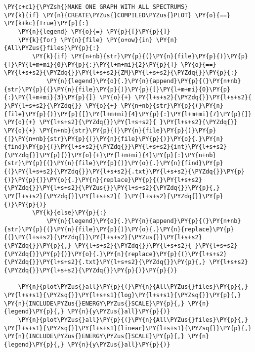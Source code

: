 \begin{tcolorbox}[breakable, size=fbox, boxrule=1pt, pad at break*=1mm,colback=cellbackground, colframe=cellborder]
\begin{Verbatim}[commandchars=\\\{\}]
\PY{c+c1}{\PYZsh{}MAKE ONE GRAPH WITH ALL SPECTRUMS}
\PY{k}{if} \PY{n}{CREATE\PYZus{}COMPILED\PYZus{}PLOT} \PY{o}{==} \PY{k+kc}{True}\PY{p}{:}
    \PY{n}{legend} \PY{o}{=} \PY{p}{[}\PY{p}{]}
    \PY{k}{for} \PY{n}{file} \PY{o+ow}{in} \PY{n}{All\PYZus{}files}\PY{p}{:}
        \PY{k}{if} \PY{n+nb}{str}\PY{p}{(}\PY{n}{file}\PY{p}{)}\PY{p}{[}\PY{l+m+mi}{0}\PY{p}{:}\PY{l+m+mi}{2}\PY{p}{]} \PY{o}{==} \PY{l+s+s2}{\PYZdq{}}\PY{l+s+s2}{ZM}\PY{l+s+s2}{\PYZdq{}}\PY{p}{:}
            \PY{n}{legend}\PY{o}{.}\PY{n}{append}\PY{p}{(}\PY{n+nb}{str}\PY{p}{(}\PY{n}{file}\PY{p}{)}\PY{p}{[}\PY{l+m+mi}{0}\PY{p}{:}\PY{l+m+mi}{3}\PY{p}{]} \PY{o}{+} \PY{l+s+s2}{\PYZdq{}}\PY{l+s+s2}{ }\PY{l+s+s2}{\PYZdq{}} \PY{o}{+} \PY{n+nb}{str}\PY{p}{(}\PY{n}{file}\PY{p}{)}\PY{p}{[}\PY{l+m+mi}{4}\PY{p}{:}\PY{l+m+mi}{7}\PY{p}{]} \PY{o}{+} \PY{l+s+s2}{\PYZdq{}}\PY{l+s+s2}{ }\PY{l+s+s2}{\PYZdq{}} \PY{o}{+} \PY{n+nb}{str}\PY{p}{(}\PY{n}{file}\PY{p}{)}\PY{p}{[}\PY{n+nb}{str}\PY{p}{(}\PY{n}{file}\PY{p}{)}\PY{o}{.}\PY{n}{find}\PY{p}{(}\PY{l+s+s2}{\PYZdq{}}\PY{l+s+s2}{int}\PY{l+s+s2}{\PYZdq{}}\PY{p}{)}\PY{o}{+}\PY{l+m+mi}{4}\PY{p}{:}\PY{n+nb}{str}\PY{p}{(}\PY{n}{file}\PY{p}{)}\PY{o}{.}\PY{n}{find}\PY{p}{(}\PY{l+s+s2}{\PYZdq{}}\PY{l+s+s2}{.txt}\PY{l+s+s2}{\PYZdq{}}\PY{p}{)}\PY{p}{]}\PY{o}{.}\PY{n}{replace}\PY{p}{(}\PY{l+s+s2}{\PYZdq{}}\PY{l+s+s2}{\PYZus{}}\PY{l+s+s2}{\PYZdq{}}\PY{p}{,} \PY{l+s+s2}{\PYZdq{}}\PY{l+s+s2}{ }\PY{l+s+s2}{\PYZdq{}}\PY{p}{)}\PY{p}{)}
        \PY{k}{else}\PY{p}{:}
            \PY{n}{legend}\PY{o}{.}\PY{n}{append}\PY{p}{(}\PY{n+nb}{str}\PY{p}{(}\PY{n}{file}\PY{p}{)}\PY{o}{.}\PY{n}{replace}\PY{p}{(}\PY{l+s+s2}{\PYZdq{}}\PY{l+s+s2}{\PYZus{}}\PY{l+s+s2}{\PYZdq{}}\PY{p}{,} \PY{l+s+s2}{\PYZdq{}}\PY{l+s+s2}{ }\PY{l+s+s2}{\PYZdq{}}\PY{p}{)}\PY{o}{.}\PY{n}{replace}\PY{p}{(}\PY{l+s+s2}{\PYZdq{}}\PY{l+s+s2}{.txt}\PY{l+s+s2}{\PYZdq{}}\PY{p}{,} \PY{l+s+s2}{\PYZdq{}}\PY{l+s+s2}{\PYZdq{}}\PY{p}{)}\PY{p}{)}
    
    \PY{n}{plot\PYZus{}all}\PY{p}{(}\PY{n}{All\PYZus{}files}\PY{p}{,} \PY{l+s+s1}{\PYZsq{}}\PY{l+s+s1}{log}\PY{l+s+s1}{\PYZsq{}}\PY{p}{,} \PY{n}{INCLUDE\PYZus{}ENERGY\PYZus{}SCALE}\PY{p}{,} \PY{n}{legend}\PY{p}{,} \PY{n}{y\PYZus{}all}\PY{p}{)}
    \PY{n}{plot\PYZus{}all}\PY{p}{(}\PY{n}{All\PYZus{}files}\PY{p}{,} \PY{l+s+s1}{\PYZsq{}}\PY{l+s+s1}{linear}\PY{l+s+s1}{\PYZsq{}}\PY{p}{,} \PY{n}{INCLUDE\PYZus{}ENERGY\PYZus{}SCALE}\PY{p}{,} \PY{n}{legend}\PY{p}{,} \PY{n}{y\PYZus{}all}\PY{p}{)}
\end{Verbatim}
\end{tcolorbox}


